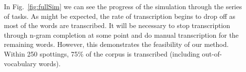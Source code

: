 \documentclass[ms]{byuprop}
\begin{document}

In Fig.~\ref{fig:fullSim} we can see the progress of the simulation through the series of tasks. As might be expected, the rate of transcription begins to drop off as most of the words are transcribed. It will be necessary to stop transcription through n-gram completion at some point and do manual transcription for the remaining words. However, this demonstrates the feasibility of our method. Within 250 spottings, 75\% of the corpus is transcribed (including out-of-vocabulary words).
\end{document}
